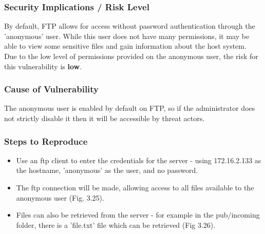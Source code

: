 \documentclass{report}
\begin{document}
\subsubsection{Security Implications / Risk Level}
By default, FTP allows for access without password authentication through the 'anonymous' user. While this user does not have many permissions, it may be able to view some sensitive files and gain information about the host system.\\
Due to the low level of permissions provided on the anonymous user, the risk for this vulnerability is \textbf{low}.
\subsubsection{Cause of Vulnerability}
The anonymous user is enabled by default on FTP, so if the administrator does not strictly disable it then it will be accessible by threat actors.
\subsubsection{Steps to Reproduce}
\begin{itemize}
	\item Use an ftp client to enter the credentials for the server - using 172.16.2.133 as the hostname, 'anonymous' as the user, and no password.
	\item The ftp connection will be made, allowing access to all files available to the anonymous user (Fig. 3.25).
	\item Files can also be retrieved from the server - for example in the pub/incoming folder, there is a 'file.txt' file which can be retrieved (Fig 3.26).
\end{itemize}
\end{document}
